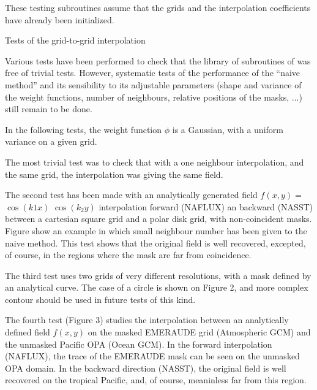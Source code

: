 \medskip
\medskip

These testing subroutines  assume
that the grids and the interpolation coefficients have already been
initialized. 



 Tests of the grid-to-grid interpolation

Various tests have been performed to check that the library of subroutines of
was free of trivial tests. However, systematic tests of the performance of
the ``naive method'' and its sensibility to its adjustable parameters (shape
and variance of the weight functions, number of neighbours, relative
positions of the masks, ...) still remain to be done. 



\medskip

In the following tests, the weight function $\phi$
 is a Gaussian, with a uniform
variance on a given grid. 

\medskip



The most trivial test was to check that with a one neighbour interpolation,
and the same grid, the interpolation was giving the same field.  



\medskip



The second test has been made with an analytically generated field $f(x,y)=$
$\cos (k1 x)$ $\cos(k_2 y)$ interpolation  forward (NAFLUX) an backward
(NASST) between a cartesian square grid and a polar disk grid, with
non-coincident masks.  Figure show an example in which 
 small neighbour number has been given
to the naive method. This test shows that the original field is well
recovered, excepted, of course, in the regions where the mask are far from
coincidence. 

\medskip





The third test  uses two grids of very different resolutions, with a mask
defined by an analytical curve.  The case of a circle  is shown on Figure 2,
and more complex contour should be used in future tests of this kind. 

\medskip





The fourth test (Figure 3) studies the interpolation between an
analytically defined field $f(x,y)$ on the masked EMERAUDE grid
(Atmospheric GCM) and the unmasked Pacific OPA (Ocean GCM).   In the
forward interpolation (NAFLUX), the trace of the EMERAUDE mask can be
seen on the unmasked OPA domain. In the backward direction (NASST), the
original field is well recovered  on the tropical Pacific, and, of course,
meaninless far from this region. 



